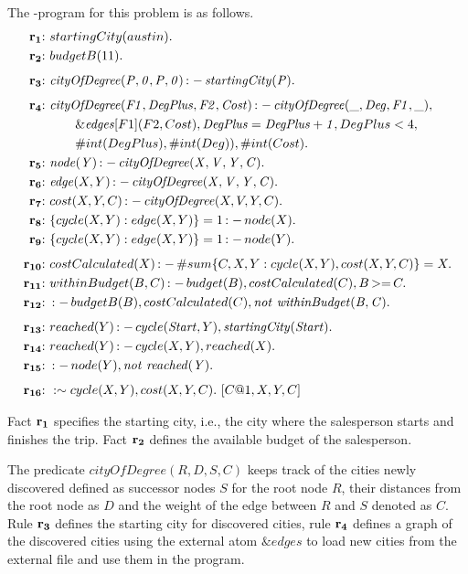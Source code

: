 \documentclass[a4paper, titlepage]{article}
\newcommand{\mi}[1]{\mathit{#1}}
\newcommand{\ext}[3]{\ensuremath{\&{\mathit{#1}}[#2](#3)}}
\DeclareMathOperator{\leftimpl}{:-}
\DeclareMathOperator{\nott}{\mathit{not}}
\DeclareMathOperator{\geeq}{>=}
\newcommand{\row}[1]{%
  \ensuremath{\color{black}\ensuremath{\mathbf{#1}} \color{black}}%
}
\newcommand{\rowprefix}[1]{%
  \ensuremath{\color{black}\mathbf{#1{:}}\ }%
}
\begin{document}
The \hex{}-program for this problem is as follows.
\begin{align*}
\rowprefix{r_1} & startingCity(austin).\\
\rowprefix{r_2} & budgetB(11).\\[1ex]
\rowprefix{r_3} & \mathit{cityOfDegree(P,0,P,0)}
  \leftimpl \mathit{startingCity(P).} \\[1ex]
\rowprefix{r_4} & \mathit{cityOfDegree(F1, DegPlus, F2, Cost)} 
  \leftimpl \mathit{cityOfDegree(\_, Deg, F1, \_)}, \\
  &\qquad\ext{edges}{F1}{F2, Cost}, \mathit{DegPlus=DegPlus+1},
    DegPlus < 4, \\
  & \qquad \#int(DegPlus), \#int(Deg)), \#int(Cost).\\
\rowprefix{r_5}& \mathit{node(Y)} \leftimpl 
  \mathit{cityOfDegree(X, V, Y, C)}.\\
\rowprefix{r_6}& \mathit{edge}(X, Y) \leftimpl 
  \mathit{cityOfDegree(X, V, Y, C).} \\
\rowprefix{r_7} & cost(X,Y,C) \leftimpl \mi{cityOfDegree}(X, V, Y, C).  \\
\rowprefix{r_8} & \{ cycle(X,Y) : edge(X,Y) \} = 1 \leftimpl 
  node(X). \\
\rowprefix{r_9} &  \{ cycle(X,Y) : edge(X,Y) \} = 1 \leftimpl 
  node(Y). \\[1ex]
\rowprefix{r_{10}} & costCalculated(X) \leftimpl \#sum \{C,X,Y : 
  cycle(X,Y), cost(X,Y,C)\} = X. \\
\rowprefix{r_{11}} & withinBudget(B,C) \leftimpl budget(B), 
  costCalculated(C), B \geeq C. \\
\rowprefix{r_{12}} & \leftimpl  budgetB(B), costCalculated(C), 
  \nott \thinspace \mathit{withinBudget(B,C).} \\[1ex]
\rowprefix{r_{13}} & reached(Y) \leftimpl cycle(\mi{Start}, Y), \mi{startingCity}(\mi{Start}). \\
\rowprefix{r_{14}} & reached(Y) \leftimpl cycle(X,Y), 
  reached(X). \\
\rowprefix{r_{15}} & \leftimpl node(Y), \nott \thinspace 
  \mathit{reached(Y)}. \\[1ex]
\rowprefix{r_{16}} & :\sim cycle(X,Y), cost(X,Y,C). \ [C@1,X,Y,C] 
\end{align*}

Fact $\row{r_1}$ specifies the starting city,
i.e., the city where the salesperson starts and finishes the trip.
Fact $\row{r_2}$ defines the available budget of the salesperson.

The predicate $\mathit{cityOfDegree}(R,D,S,C)$ keeps 
track of the cities newly discovered defined as successor 
nodes $S$ for the root node $R$, their distances from the 
root node as $D$ and the weight of the edge between $R$ and $S$ 
denoted as $C$.
Rule $\row{r_3}$ defines the starting city for discovered cities,
rule $\row{r_4}$ defines a graph of the discovered cities
using the external atom 
$\mathit{\&edges}$ to load new cities from the external 
file and use them in the program.
\end{document}
